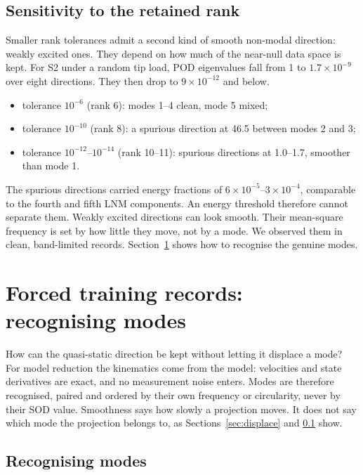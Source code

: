 \documentclass[11pt]{article}
\begin{document}
\subsection{Sensitivity to the retained rank}\label{sec:rank}
Smaller rank tolerances admit a second kind of smooth non-modal direction: weakly excited ones. They depend on how much of the near-null data space is kept.
For S2 under a random tip load, POD eigenvalues fall from 1 to $1.7\times10^{-9}$ over eight directions. They then drop to $9\times10^{-12}$ and below.
\begin{itemize}
\item tolerance $10^{-6}$ (rank 6): modes 1--4 clean, mode 5 mixed;
\item tolerance $10^{-10}$ (rank 8): a spurious direction at 46.5 between modes 2 and 3;
\item tolerance $10^{-12}$--$10^{-14}$ (rank 10--11): spurious directions at 1.0--1.7, smoother than mode 1.
\end{itemize}
The spurious directions carried energy fractions of $6\times10^{-5}$--$3\times10^{-4}$, comparable to the fourth and fifth LNM components. An energy threshold therefore cannot separate them.
Weakly excited directions can look smooth. Their mean-square frequency is set by how little they move, not by a mode.
We observed them in clean, band-limited records. Section~\ref{sec:noise} shows how to recognise the genuine modes.

\section{Forced training records: recognising modes}\label{sec:noise}
How can the quasi-static direction be kept without letting it displace a mode?
For model reduction the kinematics come from the model: velocities and state derivatives are exact, and no measurement noise enters.
Modes are therefore recognised, paired and ordered by their own frequency or circularity, never by their SOD value. Smoothness says how slowly a projection moves. It does not say which mode the projection belongs to, as Sections~\ref{sec:displace} and \ref{sec:rank} show.

\subsection{Recognising modes}\label{sec:recog}
\end{document}
